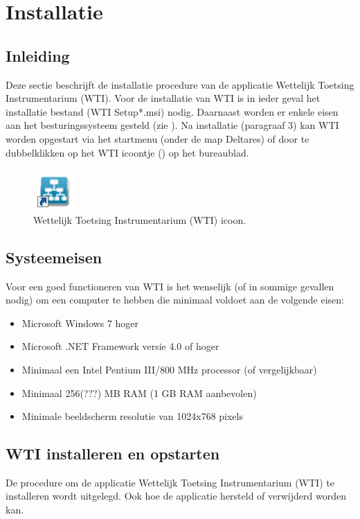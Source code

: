 
\chapter{Installatie\label{chap:install}}

\section{Inleiding}
Deze sectie beschrijft de installatie procedure van de applicatie Wettelijk Toetsing Instrumentarium (WTI). Voor de installatie van WTI is in ieder geval het installatie bestand (WTI Setup*.msi) nodig. Daarnaast worden er enkele eisen aan het besturingssysteem gesteld (zie ). Na installatie (paragraaf 3) kan WTI worden opgestart via het startmenu (onder de map Deltares) of door te dubbelklikken op het WTI icoontje () op het bureaublad. 


\begin{figure} [H]
	\centering
		\includegraphics{figures/chapter_installation/wti_desktop_icon}
	\caption{Wettelijk Toetsing Instrumentarium (WTI) icoon.}
	\label{fig:fig2.1}
\end{figure}


\section{Systeemeisen}
\label{sec:sysrequirements}
Voor een goed functioneren van WTI is het wenselijk (of in sommige gevallen nodig) om een computer te hebben die minimaal voldoet aan de volgende eisen:
\begin{itemize}
	\item Microsoft Windows 7 hoger
	\item Microsoft .NET Framework versie 4.0 of hoger
	\item Minimaal een Intel Pentium III/800 MHz processor (of vergelijkbaar)
	\item Minimaal 256(???) MB RAM (1 GB RAM aanbevolen)
	\item Minimale beeldscherm resolutie van 1024x768 pixels
\end{itemize}




\section{WTI installeren en opstarten}
De procedure om de applicatie Wettelijk Toetsing Instrumentarium (WTI) te installeren wordt uitgelegd. Ook hoe de applicatie hersteld of verwijderd worden kan.

